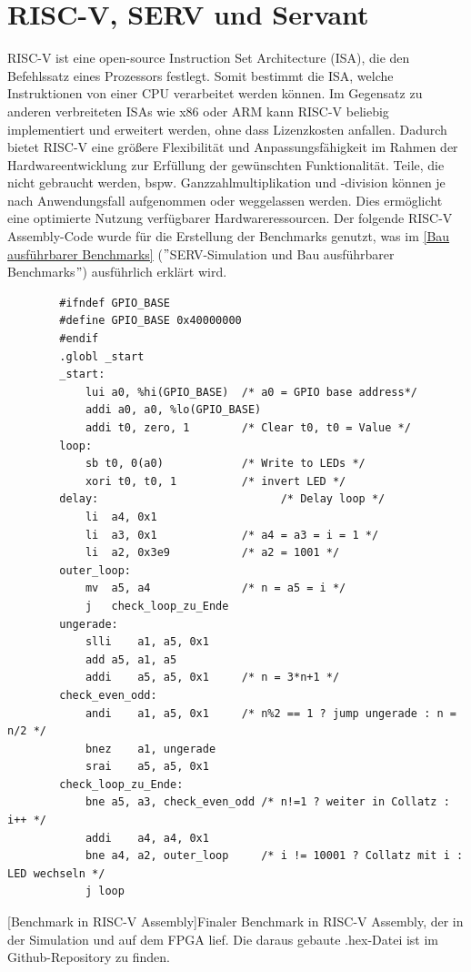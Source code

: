 \section{RISC-V, SERV und Servant}
    RISC-V \parencite{risc-v-website} ist eine open-source Instruction Set Architecture (ISA), die den Befehlssatz eines Prozessors festlegt.
    Somit bestimmt die ISA, welche Instruktionen von einer CPU verarbeitet werden können.
    Im Gegensatz zu anderen verbreiteten ISAs wie x86 oder ARM kann RISC-V beliebig implementiert und erweitert werden, ohne dass Lizenzkosten anfallen.
    Dadurch bietet RISC-V eine größere Flexibilität und Anpassungsfähigkeit im Rahmen der Hardwareentwicklung zur Erfüllung der gewünschten Funktionalität.
    Teile, die nicht gebraucht werden, bspw. Ganzzahlmultiplikation und -division können je nach Anwendungsfall aufgenommen oder weggelassen werden.
    Dies ermöglicht eine optimierte Nutzung verfügbarer Hardwareressourcen.
    Der folgende RISC-V Assembly-Code wurde für die Erstellung der Benchmarks genutzt, was im \cref{Bau ausführbarer Benchmarks} (\("\)SERV-Simulation und Bau ausführbarer Benchmarks\("\)) ausführlich erklärt wird.

    \begin{verbatim}
        #ifndef GPIO_BASE
        #define GPIO_BASE 0x40000000
        #endif
        .globl _start
        _start:
	        lui a0, %hi(GPIO_BASE)  /* a0 = GPIO base address*/
	        addi a0, a0, %lo(GPIO_BASE)
	        addi t0, zero, 1        /* Clear t0, t0 = Value */
        loop:
            sb t0, 0(a0)            /* Write to LEDs */
            xori t0, t0, 1          /* invert LED */
        delay:                            /* Delay loop */
            li	a4, 0x1
            li	a3, 0x1             /* a4 = a3 = i = 1 */
            li	a2, 0x3e9           /* a2 = 1001 */
        outer_loop:
            mv	a5, a4              /* n = a5 = i */
            j	check_loop_zu_Ende
        ungerade:
            slli	a1, a5, 0x1
            add	a5, a1, a5
            addi	a5, a5, 0x1     /* n = 3*n+1 */
        check_even_odd:
            andi	a1, a5, 0x1     /* n%2 == 1 ? jump ungerade : n = n/2 */
            bnez	a1, ungerade
            srai	a5, a5, 0x1
        check_loop_zu_Ende:
            bne	a5, a3, check_even_odd /* n!=1 ? weiter in Collatz : i++ */
            addi	a4, a4, 0x1
            bne	a4, a2, outer_loop     /* i != 10001 ? Collatz mit i : LED wechseln */
            j loop
    \end{verbatim}
    [Benchmark in RISC-V Assembly]{Finaler Benchmark in RISC-V Assembly, der in der Simulation und auf dem FPGA lief. Die daraus gebaute .hex-Datei ist im Github-Repository \parencite{GitHub-Bachelorarbeit} zu finden.}
    \label{lst:collatz.S}


